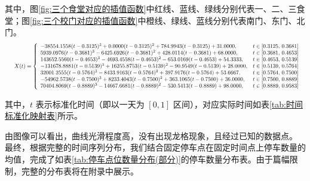 \documentclass[withoutpreface,bwprint]{cumcmthesis}
\begin{document}
其中，图\ref{fig:三个食堂对应的插值函数}中红线、蓝线、绿线分别代表一、二、三食堂；图\ref{fig:三个校门对应的插值函数}中橙线、绿线、蓝线分别代表南门、东门、北门。
\begin{equation}
    \makebox[\textwidth][l]{ %
    \resizebox{\textwidth}{!}{$
    X(t) =
    \left\{
    \begin{array}{ll}
    -38554.1558(t - 0.3125)^3 + 0.0000(t - 0.3125)^2 + 784.9943(t - 0.3125) + 31.0000, & t \in [0.3125,\, 0.3681] \\
    5939.0976(t - 0.3681)^3 - 6425.6926(t - 0.3681)^2 + 428.0114(t - 0.3681) + 68.0000, & t \in [0.3681,\, 0.4653] \\
    143652.5560(t - 0.4653)^3 - 4693.4558(t - 0.4653)^2 - 653.0169(t - 0.4653) + 54.3333, & t \in [0.4653,\, 0.5139] \\
    -131678.8881(t - 0.5139)^3 + 16255.8753(t - 0.5139)^2 - 90.9549(t - 0.5139) + 28.0000, & t \in [0.5139,\, 0.5764] \\
    32001.2555(t - 0.5764)^3 - 8433.9163(t - 0.5764)^2 + 397.9176(t - 0.5764) + 53.6667, & t \in [0.5764,\, 0.7500] \\
    -54962.5738(t - 0.7500)^3 + 8233.4043(t - 0.7500)^2 + 363.1065(t - 0.7500) + 36.0000, & t \in [0.7500,\, 0.8889] \\
    70404.8069(t - 0.8889)^3 - 14667.6681(t - 0.8889)^2 - 530.5413(t - 0.8889) + 98.0000, & t \in [0.8889,\, 0.9583]
    \end{array}
    \right.
    $}
    }
\end{equation}

其中，$t$ 表示标准化时间（即以一天为 $[0, 1]$ 区间），对应实际时间如表\ref{tab:时间标准化映射表}所示。

由图像可以看出，曲线光滑程度高，没有出现龙格现象，且经过已知的数据点。
最终，根据完整的时间序列分布，我们结合固定停车点在固定时间点上停车数量的均值，完成了如表\ref{tab:停车点位数量分布(部分)}的停车数量分布表。由于篇幅限制，完整的分布表将在附录中展示。
\end{document}
